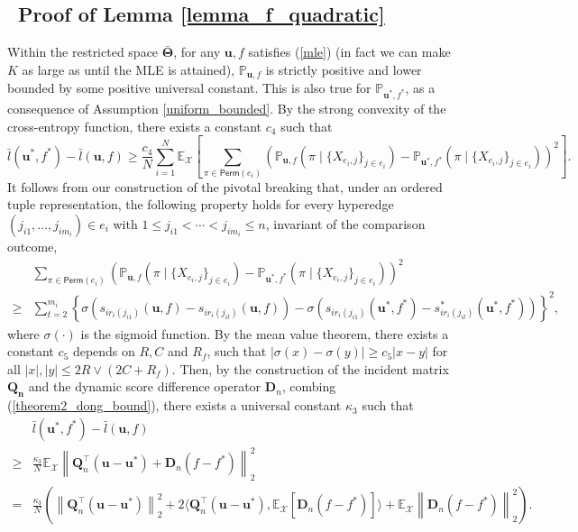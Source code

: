 \documentclass[
  12pt]{article}
\begin{document}
\subsection{~Proof of Lemma \ref{lemma_f_quadratic}}
 Within the restricted space $\bar{\boldsymbol{\Theta}}$, for any $\boldsymbol{u},f$ satisfies (\ref{mle}) (in fact we can make $K$ as large as until the MLE is attained), $\mathbb{P}_{\boldsymbol{u},f}$ is strictly positive and lower bounded by some positive universal constant. This is also true for $\mathbb{P}_{\boldsymbol{u}^*,f^*}$, as a consequence of Assumption \ref{uniform_bounded}. By the strong convexity of the cross-entropy function, there exists a constant $c_4$ such that
$$\bar{l}\left(\boldsymbol{u}^*,f^*\right)-\bar{l}(\boldsymbol{u},f)
 \geq \frac{c_4}{N}  \sum_{i=1}^N  \mathbb{E}_{\mathcal{X}} \left[\sum_{\pi \in \mathsf{Perm}\left(e_i\right)}\left(\mathbb{P}_{\boldsymbol{u},f}\left(\pi \mid \{X_{e_i, j}\}_{j \in e_i}\right)-\mathbb{P}_{\boldsymbol{u}^*,f^*}\left(\pi \mid \{X_{e_i, j}\}_{j \in e_i}\right)\right)^2 \right].$$
\noindent It follows from our construction of the pivotal breaking that, under an ordered tuple representation, the following property holds for every hyperedge $\left(j_{i 1}, \ldots, j_{i m_i}\right) \in e_i$ with $1 \leq j_{i 1} < \cdots < j_{i m_i} \leq n$, invariant of the comparison outcome,
\begin{align}
&\sum_{\pi \in \mathsf{Perm}\left(e_i\right)}\left(\mathbb{P}_{\boldsymbol{u},f}\left(\pi \mid \{X_{e_i, j}\}_{j \in e_i}\right)-\mathbb{P}_{\boldsymbol{u}^*,f^*}\left(\pi \mid \{X_{e_i, j}\}_{j \in e_i}\right)\right)^2 \nonumber\\
\geq&\sum_{t=2}^{m_i}\left\{\sigma(s_{i r_i(j_{i 1})}(\boldsymbol{u},f)-s_{i r_i(j_{i t})}(\boldsymbol{u},f))-\sigma(s_{i r_i(j_{i 1})}(\boldsymbol{u}^*,f^*)-s_{i r_i(j_{i t})}^*(\boldsymbol{u}^*,f^*))\right\}^2,\label{theorem2_dong_bound}
\end{align}
\noindent where $\sigma(\cdot)$ is the sigmoid function. By the mean value theorem, there exists a constant $c_5$ depends on $R,C$ and $R_f$, such that
$|\sigma(x)-\sigma(y)| \geq c_5|x-y| $ for all $|x|, |y| \leq 2R \vee (2C+R_f)$. Then, by the construction of the incident matrix $\boldsymbol{Q_n}$ and the dynamic score difference operator $\boldsymbol{D}_n$, combing (\ref{theorem2_dong_bound}), there exists a universal constant $\kappa_3$ such that
$$\begin{aligned}
&\bar{l}\left(\boldsymbol{u}^*,f^*\right)-\bar{l}(\boldsymbol{u},f) \\
 \geq &\frac{\kappa_3}{N}\mathbb{E}_{\mathcal{X}}\left\|\boldsymbol{Q}_n^{\top}\left(\boldsymbol{u}-\boldsymbol{u}^*\right)  + \boldsymbol{D}_n\left(f-f^*\right)\right\|_2^2\\
 = &\frac{\kappa_3}{N}\left(\left\|\boldsymbol{Q}_n^{\top}\left(\boldsymbol{u}-\boldsymbol{u}^*\right)\right\|_2^2+2\langle\boldsymbol{Q}_n^{\top}\left(\boldsymbol{u}-\boldsymbol{u}^*\right), \mathbb{E}_{\mathcal{X}}[\boldsymbol{D}_n\left(f-f^*\right)] \rangle+   \mathbb{E}_{\mathcal{X}}\left\|\boldsymbol{D}_n\left(f-f^*\right)\right\|_2^2 \right).
\end{aligned}$$
\end{document}

